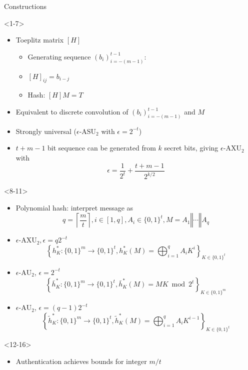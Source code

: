 \documentclass[xcolor=dvipsnames]{beamer}
\newcommand{\concat}{\mathbin{\Vert}} %
\newcommand{\?}{\mathrel{?}} %
\newcommand{\ceil}[1]{\left\lceil#1\right\rceil} %
\newcommand{\matr}[1]{\left[#1\right]} %
\newcommand{\AU}{\mathrm{AU}_{2}}
\newcommand{\AXU}{\mathrm{AXU}_{2}}
\newcommand{\ASU}{\mathrm{ASU}_{2}}
\newcommand{\eAU}{\epsilon\text{-}\AU}
\newcommand{\eAXU}{\epsilon\text{-}\AXU}
\newcommand{\eASU}{\epsilon\text{-}\ASU}
\begin{document}
\begin{frame}{Constructions}
  \begin{onlyenv}<1-7>
    \begin{itemize}[<+->]
      \item Toeplitz matrix \(\matr{H}\)
        \begin{itemize}
          \item Generating sequence \({(b_i)}_{i=-(m-1)}^{t-1}\):
          \item \(\matr{H}_{ij} = b_{i-j}\)
          \item Hash: \(\matr{H}M = T\)
        \end{itemize}
      \item Equivalent to discrete convolution of \({(b_i)}_{i=-(m-1)}^{t-1}\) and \(M\)
      \item Strongly universal (\(\eASU\) with \(\epsilon = 2^{-t}\))
      \item \(t+m-1\) bit sequence can be generated from \(k\) secret bits, giving \(\eAXU\) with
        \[ \epsilon = \frac{1}{2^t} + \frac{t + m - 1}{2^{k/2}} \]
    \end{itemize}
  \end{onlyenv}
  \begin{onlyenv}<8-11>
    \begin{itemize}[<+->]
      \item Polynomial hash: interpret message as
        \[ q = \ceil{\frac{m}{t}}, i \in [1,q], A_i \in {\{0,1\}}^t, M = A_1 \concat \cdots \concat A_q \]
      \item \(\eAXU, \epsilon = q2^{-t}\)
        \[ {\left\{ h^*_K : {\{0,1\}}^m \to {\{0,1\}}^t, h^*_K(M) = \bigoplus_{i=1}^q {A_i}K^i \right\}}_{K \in {\{0,1\}}^t} \]
      \item \(\eAU\), \(\epsilon = 2^{-t}\)
        \[
          {\left\{ \bar{h}^*_K : {\{0,1\}}^m \to {\{0,1\}}^t, \bar{h}^*_K(M) = MK \bmod 2^t \right\}}_{K \in {\{0,1\}}^m}
        \]
      \item \(\eAU\), \(\epsilon = (q-1)2^{-t}\)
        \[
          {\left\{ \tilde{h}^*_K : {\{0,1\}}^m \to {\{0,1\}}^t, \tilde{h}^*_K(M) = \bigoplus_{i=1}^q {A_i}K^{i-1} \right\}}_{K \in {\{0,1\}}^t}
        \]
    \end{itemize}
  \end{onlyenv}
  \begin{onlyenv}<12-16>
    \begin{itemize}[<+->]
      \item Authentication achieves bounds for integer \(m/t\) 

\end{itemize}
\end{onlyenv}
\end{frame}
\end{document}
